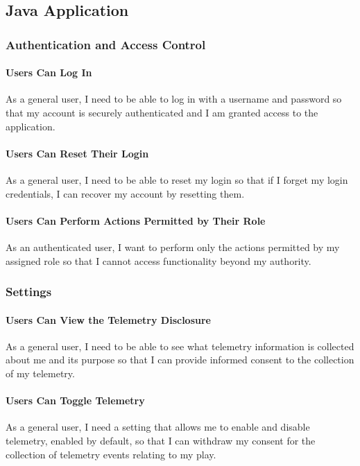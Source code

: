 \subsection{Java Application}

\subsubsection{Authentication and Access Control}

\paragraph{Users Can Log In}
As a general user, I need to be able to log in with a username and password so that my account is securely authenticated and I am granted access to the application.

\paragraph{Users Can Reset Their Login}
As a general user, I need to be able to reset my login so that if I forget my login credentials, I can recover my account by resetting them.

\paragraph{Users Can Perform Actions Permitted by Their Role}
As an authenticated user, I want to perform only the actions permitted by my assigned role so that I cannot access functionality beyond my authority.

\subsubsection{Settings}

\paragraph{Users Can View the Telemetry Disclosure}
As a general user, I need to be able to see what telemetry information is collected about me and its purpose so that I can provide informed consent to the collection of my telemetry.

\paragraph{Users Can Toggle Telemetry}
As a general user, I need a setting that allows me to enable and disable telemetry, enabled by default, so that I can withdraw my consent for the collection of telemetry events relating to my play.

